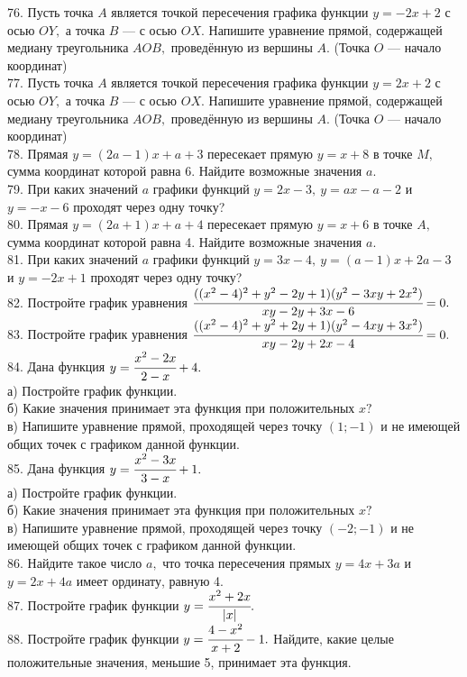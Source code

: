 76. Пусть точка $A$ является точкой пересечения графика функции $y=-2x+2$ с осью $OY,$ а точка $B$ --- с осью $OX.$ Напишите уравнение прямой, содержащей медиану треугольника $AOB,$ проведённую из вершины $A.$ (Точка $O$ --- начало координат)\\
77. Пусть точка $A$ является точкой пересечения графика функции $y=2x+2$ с осью $OY,$ а точка $B$ --- с осью $OX.$ Напишите уравнение прямой, содержащей медиану треугольника $AOB,$ проведённую из вершины $A.$ (Точка $O$ --- начало координат)\\
78. Прямая $y=(2a-1)x+a+3$ пересекает прямую $y=x+8$ в точке $M,$ сумма координат которой равна 6. Найдите возможные значения $a.$\\
79. При каких значений $a$ графики функций $y=2x-3,\ y=ax-a-2$ и $y=-x-6$ проходят через одну точку?\\
80. Прямая $y=(2a+1)x+a+4$ пересекает прямую $y=x+6$ в точке $A,$ сумма координат которой равна 4. Найдите возможные значения $a.$\\
81. При каких значений $a$ графики функций $y=3x-4,\ y=(a-1)x+2a-3$ и $y=-2x+1$ проходят через одну точку?\\
82. Постройте график уравнения $\cfrac{((x^2-4)^2+y^2-2y+1)(y^2-3xy+2x^2)}{xy-2y+3x-6}=0.$\\
83. Постройте график уравнения $\cfrac{((x^2-4)^2+y^2+2y+1)(y^2-4xy+3x^2)}{xy-2y+2x-4}=0.$\\
84. Дана функция $y=\cfrac{x^2-2x}{2-x}+4.$\\
а) Постройте график функции.\\
б) Какие значения принимает эта функция при положительных $x?$\\
в) Напишите уравнение прямой, проходящей через точку $(1;-1)$ и не имеющей общих точек с графиком данной функции.\\
85. Дана функция $y=\cfrac{x^2-3x}{3-x}+1.$\\
а) Постройте график функции.\\
б) Какие значения принимает эта функция при положительных $x?$\\
в) Напишите уравнение прямой, проходящей через точку $(-2;-1)$ и не имеющей общих точек с графиком данной функции.\\
86. Найдите такое число $a,$ что точка пересечения прямых $y=4x+3a$ и $y=2x+4a$ имеет ординату, равную 4.\\
87. Постройте график функции $y=\cfrac{x^2+2x}{|x|}.$\\
88. Постройте график функции $y=\cfrac{4-x^2}{x+2}-1.$ Найдите, какие целые положительные значения, меньшие 5, принимает эта функция.\\
